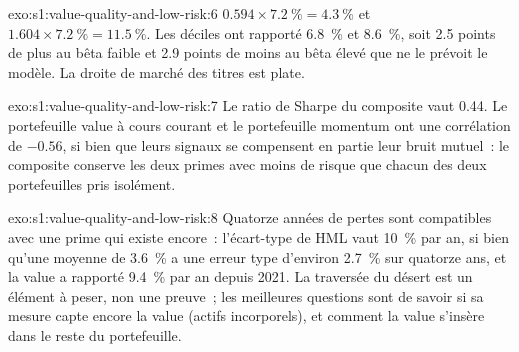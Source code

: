 \begin{solution}{exo:s1:value-quality-and-low-risk:6}
$0.594 \times 7.2~\% = 4.3~\%$ et $1.604 \times 7.2~\% = 11.5~\%$. Les déciles ont rapporté 6.8~\% et 8.6~\%, soit 2.5 points de plus au bêta faible et 2.9 points de moins au
bêta élevé que ne le prévoit le modèle. La droite de marché des titres est plate.
\end{solution}

\begin{solution}{exo:s1:value-quality-and-low-risk:7}
Le ratio de Sharpe du composite vaut 0.44. Le portefeuille value à cours courant et le portefeuille momentum ont une corrélation de $-0.56$, si bien que leurs signaux
se compensent en partie leur bruit mutuel~: le composite conserve les deux primes avec moins de risque que chacun des deux portefeuilles pris isolément.
\end{solution}

\begin{solution}{exo:s1:value-quality-and-low-risk:8}
Quatorze années de pertes sont compatibles avec une prime qui existe encore~: l'écart-type de HML vaut 10~\% par an, si bien qu'une moyenne de 3.6~\% a une erreur type d'environ
2.7~\% sur quatorze ans, et la value a rapporté 9.4~\% par an depuis 2021. La traversée du désert est un élément à peser, non une preuve~; les meilleures questions sont de savoir si sa
mesure capte encore la value (actifs incorporels), et comment la value s'insère dans le reste du portefeuille.
\end{solution}

